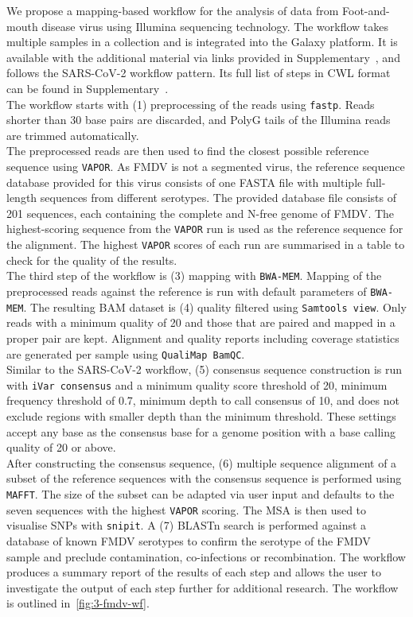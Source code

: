 We propose a mapping-based workflow for the analysis of data from Foot-and-mouth disease virus using Illumina sequencing technology. The workflow takes multiple samples in a collection and is integrated into the Galaxy platform. It is available with the additional material via links provided in Supplementary~, and follows the \ac{SARS-CoV-2} workflow pattern. Its full list of steps in \ac{CWL} format can be found in Supplementary~. \\
The workflow starts with (1) preprocessing of the reads using \texttt{fastp}. Reads shorter than 30 base pairs are discarded, and PolyG tails of the Illumina reads are trimmed automatically. \\
The preprocessed reads are then used to find the closest possible reference sequence using \texttt{VAPOR}. As \ac{FMDV} is not a segmented virus, the reference sequence database provided for this virus consists of one FASTA file with multiple full-length sequences from different serotypes. The provided database file consists of 201 sequences, each containing the complete and N-free genome of \ac{FMDV}. The highest-scoring sequence from the \texttt{VAPOR} run is used as the reference sequence for the alignment. The highest \texttt{VAPOR} scores of each run are summarised in a table to check for the quality of the results. \\
The third step of the workflow is (3) mapping with \texttt{BWA-MEM}. Mapping of the preprocessed reads against the reference is run with default parameters of \texttt{BWA-MEM}. The resulting \ac{BAM} dataset is (4) quality filtered using \texttt{Samtools view}. Only reads with a minimum quality of 20 and those that are paired and mapped in a proper pair are kept. Alignment and quality reports including coverage statistics are generated per sample using \texttt{QualiMap BamQC}. \\
Similar to the \ac{SARS-CoV-2} workflow, (5) consensus sequence construction is run with \texttt{iVar consensus} and a minimum quality score threshold of 20, minimum frequency threshold of 0.7, minimum depth to call consensus of 10, and does not exclude regions with smaller depth than the minimum threshold. These settings accept any base as the consensus base for a genome position with a base calling quality of 20 or above. \\
After constructing the consensus sequence, (6) multiple sequence alignment of a subset of the reference sequences with the consensus sequence is performed using \texttt{MAFFT}. The size of the subset can be adapted via user input and defaults to the seven sequences with the highest \texttt{VAPOR} scoring. The \ac{MSA} is then used to visualise SNPs with \texttt{snipit}. A (7) BLASTn search is performed against a database of known FMDV serotypes to confirm the serotype of the FMDV sample and preclude contamination, co-infections or recombination. The workflow produces a summary report of the results of each step and allows the user to investigate the output of each step further for additional research. The workflow is outlined in~\ref{fig:3-fmdv-wf}.
